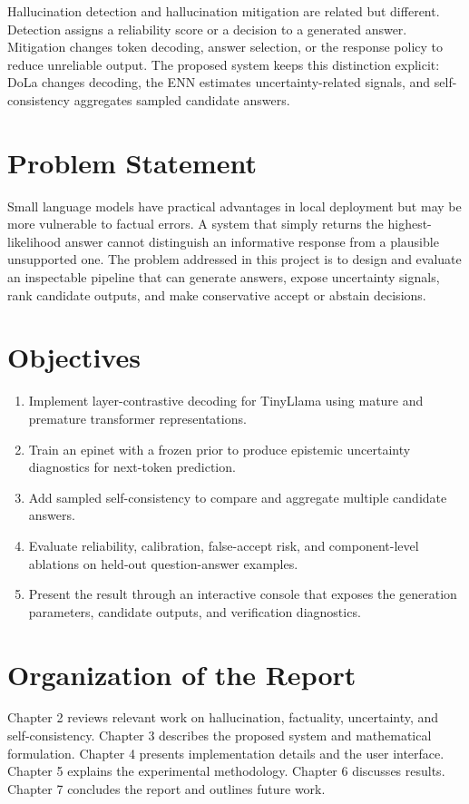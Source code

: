 \documentclass[12pt,a4paper,oneside]{report}
\begin{document}
Hallucination detection and hallucination mitigation are related but different. Detection assigns a reliability score or a decision to a generated answer. Mitigation changes token decoding, answer selection, or the response policy to reduce unreliable output. The proposed system keeps this distinction explicit: DoLa changes decoding, the ENN estimates uncertainty-related signals, and self-consistency aggregates sampled candidate answers.

\section{Problem Statement}
Small language models have practical advantages in local deployment but may be more vulnerable to factual errors. A system that simply returns the highest-likelihood answer cannot distinguish an informative response from a plausible unsupported one. The problem addressed in this project is to design and evaluate an inspectable pipeline that can generate answers, expose uncertainty signals, rank candidate outputs, and make conservative accept or abstain decisions.

\section{Objectives}
\begin{enumerate}[label=\arabic*.]
\item Implement layer-contrastive decoding for TinyLlama using mature and premature transformer representations.
\item Train an epinet with a frozen prior to produce epistemic uncertainty diagnostics for next-token prediction.
\item Add sampled self-consistency to compare and aggregate multiple candidate answers.
\item Evaluate reliability, calibration, false-accept risk, and component-level ablations on held-out question-answer examples.
\item Present the result through an interactive console that exposes the generation parameters, candidate outputs, and verification diagnostics.
\end{enumerate}

\section{Organization of the Report}
Chapter 2 reviews relevant work on hallucination, factuality, uncertainty, and self-consistency. Chapter 3 describes the proposed system and mathematical formulation. Chapter 4 presents implementation details and the user interface. Chapter 5 explains the experimental methodology. Chapter 6 discusses results. Chapter 7 concludes the report and outlines future work.
\end{document}
